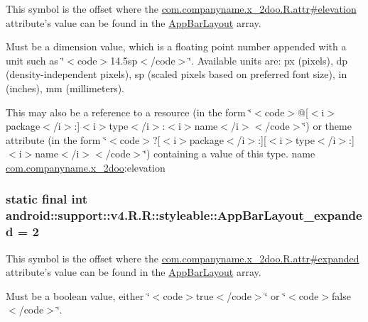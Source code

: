This symbol is the offset where the \hyperlink{classcom_1_1companyname_1_1x__2doo_1_1_r_1_1attr_3661b6445a2b19a2dca2157df91648d2}{com.companyname.x\_\-2doo.R.attr\#elevation} attribute's value can be found in the \hyperlink{classandroid_1_1support_1_1v4_1_1_r_1_1styleable_3a761a70ae130af1cc59eb59b6d9ebab}{AppBarLayout} array.

Must be a dimension value, which is a floating point number appended with a unit such as \char`\"{}$<$code$>$14.5sp$<$/code$>$\char`\"{}. Available units are: px (pixels), dp (density-independent pixels), sp (scaled pixels based on preferred font size), in (inches), mm (millimeters). 

This may also be a reference to a resource (in the form \char`\"{}$<$code$>$@\mbox{[}$<$i$>$package$<$/i$>$:\mbox{]}$<$i$>$type$<$/i$>$:$<$i$>$name$<$/i$>$$<$/code$>$\char`\"{}) or theme attribute (in the form \char`\"{}$<$code$>$?\mbox{[}$<$i$>$package$<$/i$>$:\mbox{]}\mbox{[}$<$i$>$type$<$/i$>$:\mbox{]}$<$i$>$name$<$/i$>$$<$/code$>$\char`\"{}) containing a value of this type.  name \hyperlink{namespacecom_1_1companyname_1_1x__2doo}{com.companyname.x\_\-2doo}:elevation \hypertarget{classandroid_1_1support_1_1v4_1_1_r_1_1styleable_4df0dd27ad44fc101d644efef542c6e3}{
\subsubsection[{AppBarLayout\_\-expanded}]{\setlength{\rightskip}{0pt plus 5cm}static final int android::support::v4.R.R::styleable::AppBarLayout\_\-expanded = 2}}
\label{classandroid_1_1support_1_1v4_1_1_r_1_1styleable_4df0dd27ad44fc101d644efef542c6e3}


This symbol is the offset where the \hyperlink{classcom_1_1companyname_1_1x__2doo_1_1_r_1_1attr_6f1bafa424f8cd2d54eb859d809ce486}{com.companyname.x\_\-2doo.R.attr\#expanded} attribute's value can be found in the \hyperlink{classandroid_1_1support_1_1v4_1_1_r_1_1styleable_3a761a70ae130af1cc59eb59b6d9ebab}{AppBarLayout} array.

Must be a boolean value, either \char`\"{}$<$code$>$true$<$/code$>$\char`\"{} or \char`\"{}$<$code$>$false$<$/code$>$\char`\"{}. 

